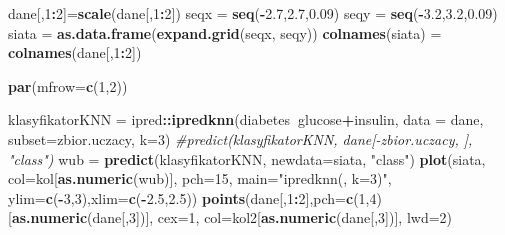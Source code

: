 \documentclass[polish,]{book}
\newenvironment{Shaded}{\begin{snugshade}}{\end{snugshade}}
\newcommand{\CommentTok}[1]{\textcolor[rgb]{0.56,0.35,0.01}{\textit{#1}}}
\newcommand{\DataTypeTok}[1]{\textcolor[rgb]{0.13,0.29,0.53}{#1}}
\newcommand{\DecValTok}[1]{\textcolor[rgb]{0.00,0.00,0.81}{#1}}
\newcommand{\FloatTok}[1]{\textcolor[rgb]{0.00,0.00,0.81}{#1}}
\newcommand{\KeywordTok}[1]{\textcolor[rgb]{0.13,0.29,0.53}{\textbf{#1}}}
\newcommand{\NormalTok}[1]{#1}
\newcommand{\OperatorTok}[1]{\textcolor[rgb]{0.81,0.36,0.00}{\textbf{#1}}}
\newcommand{\StringTok}[1]{\textcolor[rgb]{0.31,0.60,0.02}{#1}}
\begin{document}
\begin{Shaded}
\begin{Highlighting}[]
\NormalTok{dane[,}\DecValTok{1}\OperatorTok{:}\DecValTok{2}\NormalTok{]=}\KeywordTok{scale}\NormalTok{(dane[,}\DecValTok{1}\OperatorTok{:}\DecValTok{2}\NormalTok{])}
\NormalTok{seqx =}\StringTok{ }\KeywordTok{seq}\NormalTok{(}\OperatorTok{-}\FloatTok{2.7}\NormalTok{,}\FloatTok{2.7}\NormalTok{,}\FloatTok{0.09}\NormalTok{)}
\NormalTok{seqy =}\StringTok{ }\KeywordTok{seq}\NormalTok{(}\OperatorTok{-}\FloatTok{3.2}\NormalTok{,}\FloatTok{3.2}\NormalTok{,}\FloatTok{0.09}\NormalTok{)}
\NormalTok{siata =}\StringTok{ }\KeywordTok{as.data.frame}\NormalTok{(}\KeywordTok{expand.grid}\NormalTok{(seqx, seqy))}
\KeywordTok{colnames}\NormalTok{(siata) =}\StringTok{ }\KeywordTok{colnames}\NormalTok{(dane[,}\DecValTok{1}\OperatorTok{:}\DecValTok{2}\NormalTok{])}

\KeywordTok{par}\NormalTok{(}\DataTypeTok{mfrow=}\KeywordTok{c}\NormalTok{(}\DecValTok{1}\NormalTok{,}\DecValTok{2}\NormalTok{))}

\NormalTok{klasyfikatorKNN =}\StringTok{ }\NormalTok{ipred}\OperatorTok{::}\KeywordTok{ipredknn}\NormalTok{(diabetes}\OperatorTok{~}\NormalTok{glucose}\OperatorTok{+}\NormalTok{insulin, }
                                  \DataTypeTok{data =}\NormalTok{ dane, }\DataTypeTok{subset=}\NormalTok{zbior.uczacy, }\DataTypeTok{k=}\DecValTok{3}\NormalTok{)}
\CommentTok{#predict(klasyfikatorKNN, dane[-zbior.uczacy, ], "class")}
\NormalTok{wub =}\StringTok{ }\KeywordTok{predict}\NormalTok{(klasyfikatorKNN, }\DataTypeTok{newdata=}\NormalTok{siata, }\StringTok{"class"}\NormalTok{)}
\KeywordTok{plot}\NormalTok{(siata, }\DataTypeTok{col=}\NormalTok{kol[}\KeywordTok{as.numeric}\NormalTok{(wub)], }\DataTypeTok{pch=}\DecValTok{15}\NormalTok{, }\DataTypeTok{main=}\StringTok{"ipredknn(, k=3)"}\NormalTok{,}
     \DataTypeTok{ylim=}\KeywordTok{c}\NormalTok{(}\OperatorTok{-}\DecValTok{3}\NormalTok{,}\DecValTok{3}\NormalTok{),}\DataTypeTok{xlim=}\KeywordTok{c}\NormalTok{(}\OperatorTok{-}\FloatTok{2.5}\NormalTok{,}\FloatTok{2.5}\NormalTok{))}
\KeywordTok{points}\NormalTok{(dane[,}\DecValTok{1}\OperatorTok{:}\DecValTok{2}\NormalTok{],}\DataTypeTok{pch=}\KeywordTok{c}\NormalTok{(}\DecValTok{1}\NormalTok{,}\DecValTok{4}\NormalTok{)[}\KeywordTok{as.numeric}\NormalTok{(dane[,}\DecValTok{3}\NormalTok{])], }\DataTypeTok{cex=}\DecValTok{1}\NormalTok{,}
       \DataTypeTok{col=}\NormalTok{kol2[}\KeywordTok{as.numeric}\NormalTok{(dane[,}\DecValTok{3}\NormalTok{])], }\DataTypeTok{lwd=}\DecValTok{2}\NormalTok{)}


\end{Highlighting}
\end{Shaded}
\end{document}
